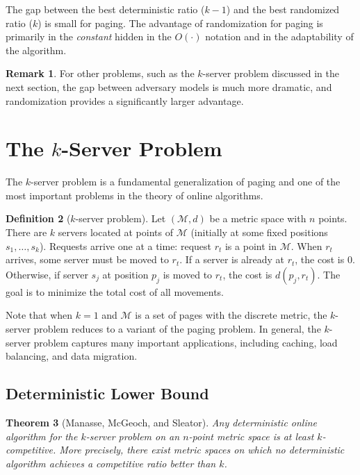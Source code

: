 \documentclass[twoside,12pt]{book}
\theoremstyle{plain}
\newtheorem{theorem}{Theorem}[chapter]
\theoremstyle{definition}
\newtheorem{definition}[theorem]{Definition}
\newtheorem{remark}[theorem]{Remark}
\theoremstyle{remark}
\begin{document}
The gap between the best deterministic ratio ($k-1$) and the best
randomized ratio ($k$) is small for paging.  The advantage of
randomization for paging is primarily in the \emph{constant} hidden in
the $O(\cdot)$ notation and in the adaptability of the algorithm.

\begin{remark}
For other problems, such as the $k$-server problem discussed in the next
section, the gap between adversary models is much more dramatic, and
randomization provides a significantly larger advantage.
\end{remark}

\section{The \texorpdfstring{$k$}{k}-Server Problem}
\label{sec:k-server}

The $k$-server problem is a fundamental generalization of paging and one
of the most important problems in the theory of online algorithms.

\begin{definition}[$k$-server problem]\label{def:k-server}
Let $(\mathcal{M}, d)$ be a metric space with $n$ points.  There are $k$
servers located at points of $\mathcal{M}$ (initially at some fixed
positions $s_1, \ldots, s_k$).  Requests arrive one at a time: request
$r_t$ is a point in $\mathcal{M}$.  When $r_t$ arrives, some server must
be moved to $r_t$.  If a server is already at $r_t$, the cost is 0.
Otherwise, if server $s_j$ at position $p_j$ is moved to $r_t$, the
cost is $d(p_j, r_t)$.  The goal is to minimize the total cost of all
movements.
\end{definition}

Note that when $k=1$ and $\mathcal{M}$ is a set of pages with the
discrete metric, the $k$-server problem reduces to a variant of the
paging problem.  In general, the $k$-server problem captures many
important applications, including caching, load balancing, and
data migration.

\subsection{Deterministic Lower Bound}

\begin{theorem}[Manasse, McGeoch, and Sleator]\label{thm:k-server-det-lb}
Any deterministic online algorithm for the $k$-server problem on an
$n$-point metric space is at least $k$-competitive.  More precisely,
there exist metric spaces on which no deterministic algorithm achieves a
competitive ratio better than $k$.
\end{theorem}
\end{document}

